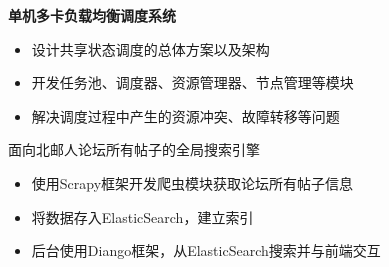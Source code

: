 \documentclass{resume}
\begin{document}
\textbf{单机多卡负载均衡调度系统}
\begin{itemize}
  \item 设计共享状态调度的总体方案以及架构
  \item 开发任务池、调度器、资源管理器、节点管理等模块
  \item 解决调度过程中产生的资源冲突、故障转移等问题
\end{itemize}

\begin{onehalfspacing}
面向北邮人论坛所有帖子的全局搜索引擎
\begin{itemize}
  \item 使用Scrapy框架开发爬虫模块获取论坛所有帖子信息
  \item 将数据存入ElasticSearch，建立索引
  \item 后台使用Diango框架，从ElasticSearch搜索并与前端交互
\end{itemize}
\end{onehalfspacing}



\end{document}

